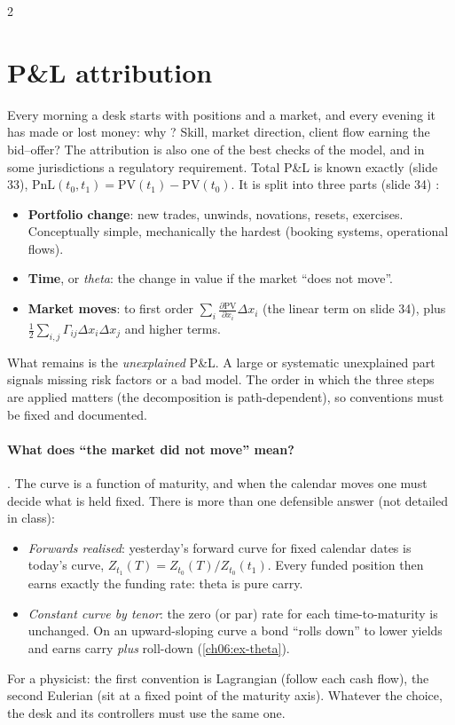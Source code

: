 \begin{paracol}{2}
\section{P\&L attribution}\label{ch06:sec-pnl}
Every morning a desk starts with positions and a market, and every evening it has made or lost money: why
? Skill, market direction, client flow earning the bid--offer? The attribution is also one of the
best checks of the model, and in some jurisdictions a regulatory requirement. Total P\&L is known exactly (slide 33),
$\mathrm{PnL}(t_0,t_1)=\mathrm{PV}(t_1)-\mathrm{PV}(t_0)$. It is split into three parts (slide 34)
:
\begin{itemize}
  \item \textbf{Portfolio change}: new trades, unwinds, novations, resets, exercises. Conceptually simple,
        mechanically the hardest (booking systems, operational flows).
  \item \textbf{Time}, or \emph{theta}: the change in value if the market ``does not move''.
  \item \textbf{Market moves}: to first order $\sum_i\frac{\partial\mathrm{PV}}{\partial x_i}\Delta x_i$ (the
        linear term on slide 34), plus $\frac12\sum_{i,j}\Gamma_{ij}\Delta x_i\Delta x_j$ and higher terms.
\end{itemize}
What remains is the \emph{unexplained} P\&L. A large or systematic unexplained part signals missing risk factors or
a bad model. The order in which the three steps are applied matters (the decomposition is path-dependent), so
conventions must be fixed and documented.

\paragraph{What does ``the market did not move'' mean?} . The curve is a function of maturity,
and when the calendar moves one must decide what is held fixed. There is more than one defensible answer
(not detailed in class):
\begin{itemize}
  \item \emph{Forwards realised}: yesterday's forward curve for fixed calendar dates is today's curve,
        $Z_{t_1}(T)=Z_{t_0}(T)/Z_{t_0}(t_1)$. Every funded position then earns exactly the funding rate: theta
        is pure carry.
  \item \emph{Constant curve by tenor}: the zero (or par) rate for each time-to-maturity is unchanged. On an
        upward-sloping curve a bond ``rolls down'' to lower yields and earns carry \emph{plus} roll-down
        (\cref{ch06:ex-theta}).
\end{itemize}
For a physicist: the first convention is Lagrangian (follow each cash flow), the second Eulerian (sit at a fixed
point of the maturity axis). Whatever the choice, the desk and its controllers must use the same one.


\end{paracol}

